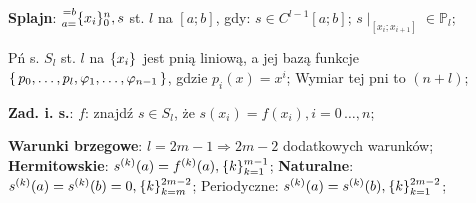 
\entry
\textbf{Splajn}:
$\ipoints[0][n][a=][=b]{x_i}, s$
st. $l$ na $[a;b]$, gdy:
$s\in C^{l-1}[a;b]$;
$s\mid_{[x_i;x_{i+1}]} \in \mathbb{P}_l$;

\entry
Pń s. $S_l$ st. $l$ na $\ipoints{x_i}$ jest pnią liniową,
a jej bazą funkcje
$\set{p_0, \ldots, p_l, \varphi_1, \ldots, \varphi_{n-1}}$,
gdzie $p_i(x)=x^i$;
\entry
Wymiar tej pni to $(n+l)$;

\entry
\textbf{Zad. i. s.}:
$f$: znajdź $s\in S_l$, że
$s(x_i)=f(x_i), i=0\,\dots,n$;

\entry
\textbf{Warunki brzegowe}:
$l=2m-1 \Rightarrow 2m-2$ dodatkowych warunków;
\entry
\textbf{Hermitowskie}:
$\deriv{s}{k}(a) = \deriv{f}{k}(a), \ipoints[k=1][m-1]{k}$;
\entry
\textbf{Naturalne}:
$\deriv{s}{k}(a)=\deriv{s}{k}(b)=0, \ipoints[k=m][2m-2]{k}$;
\entry
Periodyczne:
$\deriv{s}{k}(a)=\deriv{s}{k}(b), \ipoints[k=1][2m-2]{k}$;
